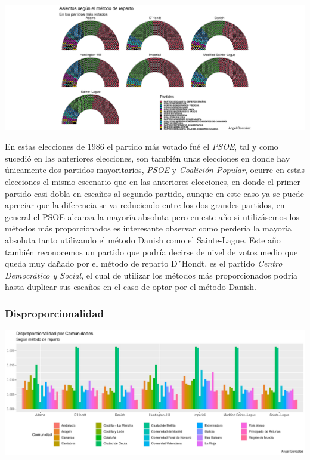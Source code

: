 \documentclass[12pt,a4paper,]{book}
\numberwithin{dummy}{section}
\theoremstyle{ocrenumbox}
\theoremstyle{blacknumex}
\theoremstyle{blacknumbox}
\theoremstyle{ocrenum}
\theoremstyle{ocrenum}
\begin{document}
\begin{center}\includegraphics[width=0.95\linewidth]{figurasR/unnamed-chunk-86-3} \end{center}

En estas elecciones de 1986 el partido más votado fué el \emph{PSOE},
tal y como sucedió en las anteriores elecciones, son también unas
elecciones en donde hay únicamente dos partidos mayoritarios,
\emph{PSOE} y \emph{Coalición Popular}, ocurre en estas elecciones el
mismo escenario que en las anteriores elecciones, en donde el primer
partido casi dobla en escaños al segundo partido, aunque en este caso ya
se puede apreciar que la diferencia se va reduciendo entre los dos
grandes partidos, en general el PSOE alcanza la mayoría absoluta pero en
este año si utilizásemos los métodos más proporcionados es interesante
observar como perdería la mayoría absoluta tanto utilizando el método
Danish como el Sainte-Lague. Este año también reconocemos un partido que
podría decirse de nivel de votos medio que queda muy dañado por el
método de reparto D´Hondt, es el partido \emph{Centro Democrático y
Social}, el cual de utilizar los métodos más proporcionados podría hasta
duplicar sus escaños en el caso de optar por el método Danish.

\hypertarget{disproporcionalidad-3}{%
\subsubsection{Disproporcionalidad}\label{disproporcionalidad-3}}

\begin{center}\includegraphics[width=0.95\linewidth]{figurasR/unnamed-chunk-87-1} \end{center}
\end{document}
